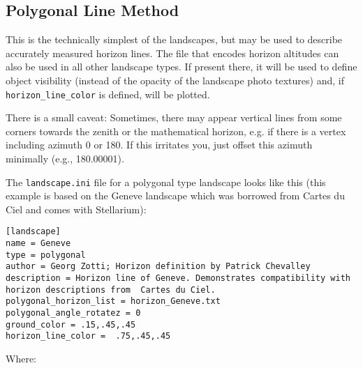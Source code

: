 \subsection{Polygonal Line Method}\label{polygonal-line-method}

This is the technically simplest of the landscapes, but may be used to
describe accurately measured horizon lines. The file that encodes
horizon altitudes can also be used in all other landscape types. If
present there, it will be used to define object visibility (instead of
the opacity of the landscape photo textures) and, if
\texttt{horizon\_line\_color} is defined, will be plotted.

There is a small caveat: Sometimes, there may appear vertical lines from
some corners towards the zenith or the mathematical horizon, e.g. if
there is a vertex including azimuth 0 or 180. If this irritates you,
just offset this azimuth minimally (e.g., 180.00001).

The \texttt{landscape.ini} file for a polygonal type landscape looks
like this (this example is based on the Geneve landscape which was
borrowed from Cartes du Ciel and comes with Stellarium):

\begin{config}
\texttt{{[}landscape{]}}\\
\texttt{name~=~Geneve}\\
\texttt{type~=~polygonal}\\
\texttt{author~=~Georg~Zotti;~Horizon~definition~by~Patrick~Chevalley}\\
\texttt{description~=~Horizon~line~of~Geneve.~Demonstrates~compatibility~with~horizon~descriptions~from~~Cartes~du~Ciel.}\\
\texttt{polygonal\_horizon\_list~=~horizon\_Geneve.txt}\\
\texttt{polygonal\_angle\_rotatez~=~0}\\
\texttt{ground\_color~=~.15,.45,.45}\\
\texttt{horizon\_line\_color~=~~.75,.45,.45}
\end{config}

Where:

